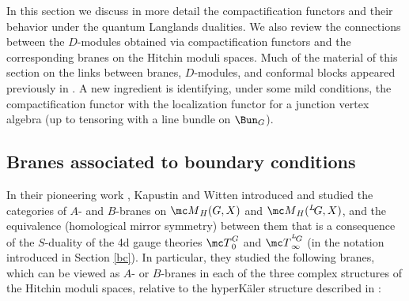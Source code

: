 \documentclass[11pt,reqno]{amsart}
\theoremstyle{plain}
\numberwithin{equation}{section}
\def\neg{\negthinspace}
\def\LG{{}^L\neg G}
\theoremstyle{definition}
\begin{document}
In this section we discuss in more detail the compactification
functors and their behavior under the quantum Langlands dualities. We
also review the connections between the $D$-modules obtained via
compactification functors and the corresponding branes on the Hitchin
moduli spaces. Much of the material of this section on the links
between branes, $D$-modules, and conformal blocks appeared previously
in \cite{KW,NW,FW,GW3,Ga1,Ga2,BT}. A new ingredient is identifying,
under some mild conditions, the compactification functor with the
localization functor for a junction vertex algebra (up to tensoring
with a line bundle on $\Bun_G$).

\subsection{Branes associated to boundary conditions}    \label{Dmod
  branes}

In their pioneering work \cite{KW}, Kapustin and Witten introduced and
studied the categories of $A$- and $B$-branes on ${\mc M}_H(G,X)$ and
${\mc M}_H(\LG,X)$, and the equivalence (homological mirror symmetry)
between them that is a consequence of the $S$-duality of the 4d gauge
theories ${\mc T}^G_0$ and ${\mc T}^{\LG}_\infty$ (in the notation
introduced in Section \ref{bc}). In particular, they studied the
following branes, which can be viewed as $A$- or $B$-branes in each of
the three complex structures of the Hitchin moduli spaces, relative to
the hyperK\"aler structure described in \cite{KW}:

\medskip
\end{document}
